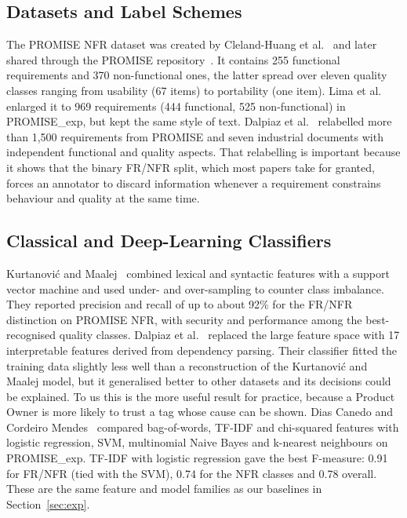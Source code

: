 \documentclass[conference,10pt,letterpaper]{IEEEtran}
\begin{document}
\subsection{Datasets and Label Schemes}
The PROMISE NFR dataset was created by Cleland-Huang et al.~\cite{clelandhuang2007} and later shared through the PROMISE repository~\cite{promisenfr2007}. It contains 255 functional requirements and 370 non-functional ones, the latter spread over eleven quality classes ranging from usability (67 items) to portability (one item). Lima et al.~\cite{lima2019} enlarged it to 969 requirements (444 functional, 525 non-functional) in PROMISE\_exp, but kept the same style of text. Dalpiaz et al.~\cite{dalpiaz2019} relabelled more than 1,500 requirements from PROMISE and seven industrial documents with independent functional and quality aspects. That relabelling is important because it shows that the binary FR/NFR split, which most papers take for granted, forces an annotator to discard information whenever a requirement constrains behaviour and quality at the same time.

\subsection{Classical and Deep-Learning Classifiers}
Kurtanović and Maalej~\cite{kurtanovic2017} combined lexical and syntactic features with a support vector machine and used under- and over-sampling to counter class imbalance. They reported precision and recall of up to about 92\% for the FR/NFR distinction on PROMISE NFR, with security and performance among the best-recognised quality classes. Dalpiaz et al.~\cite{dalpiaz2019} replaced the large feature space with 17 interpretable features derived from dependency parsing. Their classifier fitted the training data slightly less well than a reconstruction of the Kurtanović and Maalej model, but it generalised better to other datasets and its decisions could be explained. To us this is the more useful result for practice, because a Product Owner is more likely to trust a tag whose cause can be shown. Dias Canedo and Cordeiro Mendes~\cite{diascanedo2020} compared bag-of-words, TF-IDF and chi-squared features with logistic regression, SVM, multinomial Naive Bayes and k-nearest neighbours on PROMISE\_exp. TF-IDF with logistic regression gave the best F-measure: 0.91 for FR/NFR (tied with the SVM), 0.74 for the NFR classes and 0.78 overall. These are the same feature and model families as our baselines in Section~\ref{sec:exp}.
\end{document}
